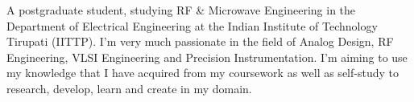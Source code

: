

\begin{cvparagraph}

A postgraduate student, studying RF \& Microwave Engineering in the Department of Electrical Engineering at the Indian Institute of Technology Tirupati (IITTP). I’m very much passionate in the field of Analog Design, RF Engineering, VLSI Engineering and Precision Instrumentation. I’m aiming to use my knowledge that I have acquired from my coursework as well as self-study to research, develop, learn and create in my domain.
\end{cvparagraph}